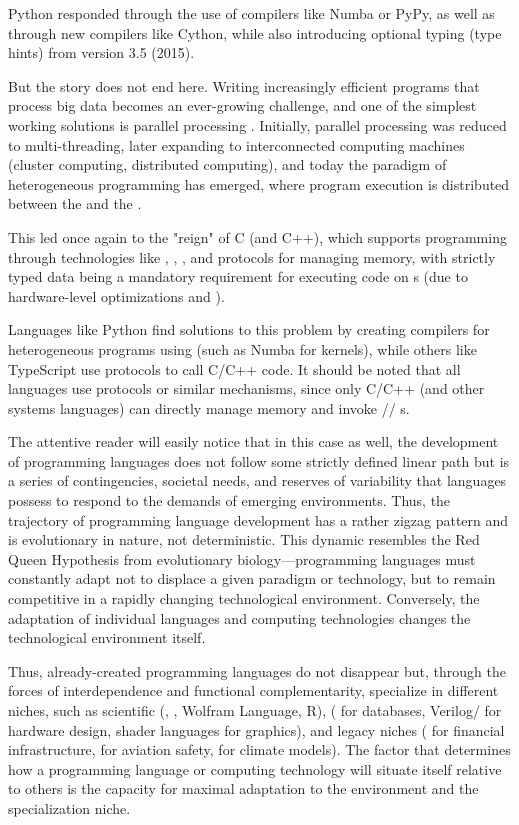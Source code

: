 Python responded through the use
of  compilers like Numba or PyPy, as well as through new compilers like Cython, while also introducing optional typing (type hints) from version 3.5 (2015).

But the story does not end here. Writing increasingly efficient programs that process big data
becomes an ever-growing challenge, and one of the simplest working solutions is parallel processing \cite{pattersonhennessy}.
Initially, parallel processing was reduced to multi-threading, later expanding to
interconnected computing machines (cluster computing, distributed computing), and today the paradigm of heterogeneous programming has emerged,
where program execution is distributed between the  and the .

This led once again to the "reign" of C (and C++), which supports  programming through technologies like , , , and protocols for
managing  memory, with strictly typed data being a mandatory requirement
for executing code on s (due to hardware-level optimizations and ).

Languages like Python find solutions to this problem by
creating compilers for heterogeneous programs using  (such as Numba for  kernels), while others like TypeScript use  protocols to call C/C++ code.
It should be noted that all languages use  protocols or similar mechanisms, since only C/C++ (and other systems languages) can directly manage  memory and invoke // s.

The attentive reader will easily notice that in this case as well,
the development of programming languages does not follow some strictly defined linear path but is a series of contingencies,
societal needs, and reserves of variability that languages possess to respond to the demands of
emerging environments. Thus, the trajectory of programming language development has a rather zigzag pattern and
is evolutionary in nature, not deterministic. This dynamic resembles the Red Queen Hypothesis from evolutionary biology—programming languages must constantly
adapt not to displace a given paradigm or technology, but to remain competitive in a rapidly changing technological environment. Conversely,
the adaptation of individual languages and computing technologies changes the technological environment itself.

Thus, already-created programming languages do not disappear but, through the forces of interdependence and functional complementarity, specialize in different niches,
such as scientific (, , Wolfram Language, R), 
( for databases, Verilog/ for hardware design, shader languages for  graphics), and legacy niches
( for financial infrastructure,  for aviation safety,  for climate models). The factor that
determines how a programming language or computing technology will situate itself relative to others is the capacity for maximal adaptation
to the environment and the specialization niche.

